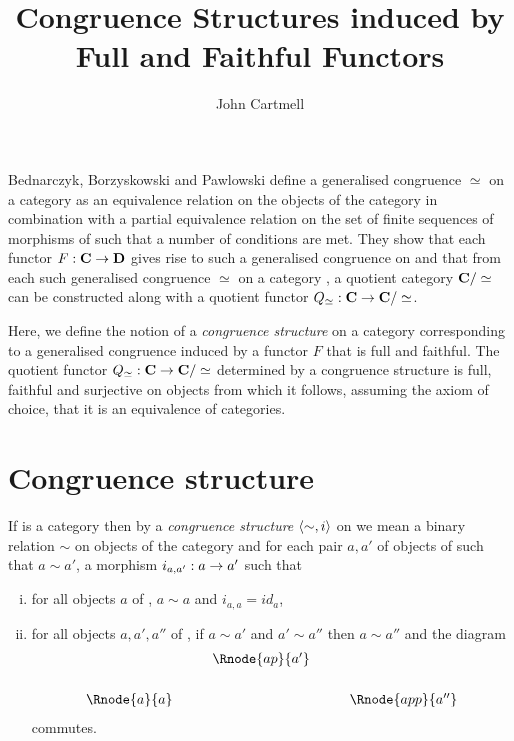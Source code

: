 \documentclass[10pt,a4paper]{article}
\theoremstyle{remark}
\renewcommand{\term}[1]{\textit{#1}}  %
\begin{document}
\title{Congruence Structures induced by Full and Faithful Functors}


\author{John Cartmell}

\maketitle
\iffalse
\begin{center}
DRAFT
\end{center}
\fi
Bednarczyk, Borzyskowski and Pawlowski \cite{Bednarczyk1999} define a generalised congruence $\simeq$ on a category
\catcw as an equivalence relation  on the objects of the category \catcw in combination
with a partial equivalence relation
on the set of finite sequences of morphisms of \catcw such that a number of conditions are met. 
They show that each functor $F: \textbf{C} \rightarrow \textbf{D}$ 
gives rise to such a generalised congruence on \catcw and that from each such generalised congruence 
$\simeq$ on a category \catc, a quotient category $\textbf{C}/\simeq$ can be constructed along with a quotient functor $Q_\simeq:\textbf{C} \rightarrow \textbf{C}/\simeq$.  

Here, we define the notion of a \term{congruence structure} on a category \catcw corresponding to a generalised congruence induced by a functor $F$ that is full and faithful. The
quotient functor $Q_\simeq:\textbf{C} \rightarrow \textbf{C}/\simeq$ determined by a congruence structure is full, faithful and surjective on objects from which it follows, assuming the axiom of choice, 
that it is an equivalence of categories.


 \section {Congruence structure}

\begin{definition}
If \catcw is a category  then by a \term{congruence structure} $\langle\sim,i\rangle$ on \catcw we mean  a binary relation $\sim$ on objects of the category \catcw and for each pair $a, a'$ of objects of \catcw such that $a \sim a'$, a morphism $i_{a,a'}:a \rightarrow a'$ such that
\begin{enumerate} [(i)]
\item  for all objects $a$ of \catc, $a \sim a$ and  $i_{a,a}=id_a$,
\item for all objects $a, a', a''$ of \catc, if $a \sim a'$ and $a' \sim a''$ then 
$a \sim a''$ and the diagram
\begin{equation}
\begin{array}{cp{.3cm}cp{.3cm}c}
              & & \Rnode{ap}{a'}  & &               \\ [0.6cm]
\Rnode{a}{a} & &                  & & \Rnode{app}{a''} 
\end{array}
\end{equation}
commutes.
\end{enumerate} 
\end{definition}
\end{document}
